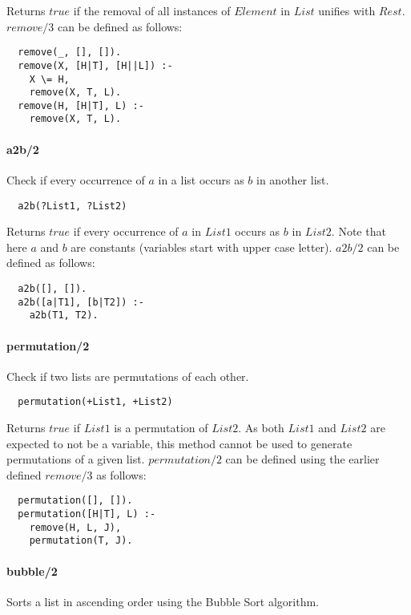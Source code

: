\documentclass{article}
\begin{document}
\begin{multicols}{2}
  Returns $true$ if the removal of all instances of $Element$ in $List$ unifies with $Rest$. $remove/3$ can be defined as follows:

  \begin{lstlisting}
  remove(_, [], []).
  remove(X, [H|T], [H||L]) :-
    X \= H,
    remove(X, T, L).
  remove(H, [H|T], L) :-
    remove(X, T, L).
  \end{lstlisting}  
  
  \paragraph{a2b/2} Check if every occurrence of $a$ in a list occurs as $b$ in another list.
  
  \begin{lstlisting}
  a2b(?List1, ?List2)
  \end{lstlisting}
  
  Returns $true$ if every occurrence of $a$ in $List1$ occurs as $b$ in $List2$. Note that here $a$ and $b$ are constants (variables start with upper case letter). $a2b/2$ can be defined as follows:

  \begin{lstlisting}
  a2b([], []).
  a2b([a|T1], [b|T2]) :-
    a2b(T1, T2).
  \end{lstlisting}   

  \paragraph{permutation/2} Check if two lists are permutations of each other.
  
  \begin{lstlisting}
  permutation(+List1, +List2)
  \end{lstlisting}
  
  Returns $true$ if $List1$ is a permutation of $List2$. As both $List1$ and $List2$ are expected to not be a variable, this method cannot be used to generate permutations of a given list. $permutation/2$ can be defined using the earlier defined $remove/3$ as follows:

  \begin{lstlisting}
  permutation([], []).
  permutation([H|T], L) :-
    remove(H, L, J),
    permutation(T, J).
  \end{lstlisting}  
  
  \paragraph{bubble/2} Sorts a list in ascending order using the Bubble Sort algorithm.
  

\end{multicols}
\end{document}
